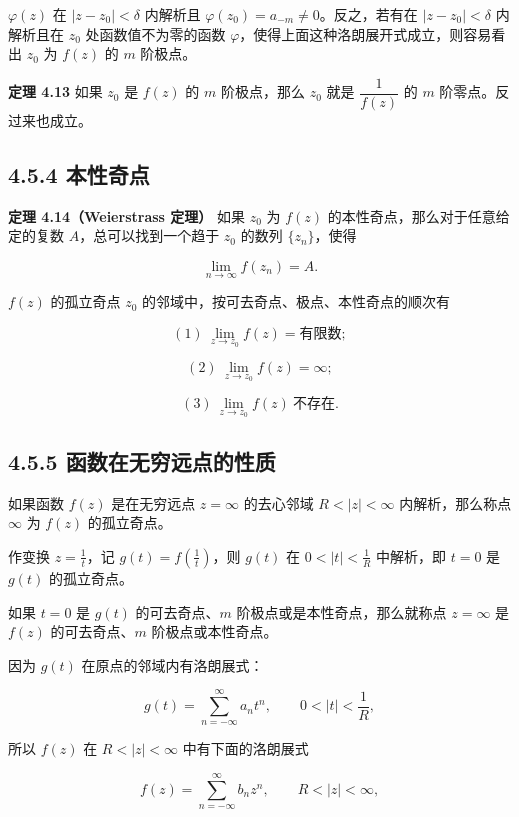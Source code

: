 \(\varphi(z)\) 在 \(|z-z_0|<\delta\) 内解析且
\(\varphi(z_0)=a_{-m}\neq 0\)。反之，若有在 \(|z-z_0|<\delta\)
内解析且在 \(z_0\) 处函数值不为零的函数
\(\varphi\)，使得上面这种洛朗展开式成立，则容易看出 \(z_0\) 为 \(f(z)\)
的 \(m\) 阶极点。

\textbf{定理 4.13} 如果 \(z_0\) 是 \(f(z)\) 的 \(m\) 阶极点，那么
\(z_0\) 就是 \(\dfrac{1}{f(z)}\) 的 \(m\) 阶零点。反过来也成立。

\subsection{4.5.4 本性奇点}\label{ux672cux6027ux5947ux70b9}

\textbf{定理 4.14（Weierstrass 定理）} 如果 \(z_0\) 为 \(f(z)\)
的本性奇点，那么对于任意给定的复数 \(A\)，总可以找到一个趋于 \(z_0\)
的数列 \(\{z_n\}\)，使得

\[
\lim_{n\to\infty}f(z_n)=A .
\]

\(f(z)\) 的孤立奇点 \(z_0\) 的邻域中，按可去奇点、极点、本性奇点的顺次有

\[
(1)\ \lim_{z\to z_0}f(z)=\text{有限数};
\]

\[
(2)\ \lim_{z\to z_0}f(z)=\infty;
\]

\[
(3)\ \lim_{z\to z_0}f(z)\ \text{不存在}.
\]

\subsection{4.5.5
函数在无穷远点的性质}\label{ux51fdux6570ux5728ux65e0ux7a77ux8fdcux70b9ux7684ux6027ux8d28}

如果函数 \(f(z)\) 是在无穷远点 \(z=\infty\) 的去心邻域 \(R<|z|<\infty\)
内解析，那么称点 \(\infty\) 为 \(f(z)\) 的孤立奇点。

作变换 \(\displaystyle z=\frac{1}{t}\)，记
\(\displaystyle g(t)=f\left(\frac{1}{t}\right)\)，则 \(g(t)\) 在
\(0<|t|<\frac{1}{R}\) 中解析，即 \(t=0\) 是 \(g(t)\) 的孤立奇点。

如果 \(t=0\) 是 \(g(t)\) 的可去奇点、\(m\)
阶极点或是本性奇点，那么就称点 \(z=\infty\) 是 \(f(z)\)
的可去奇点、\(m\) 阶极点或本性奇点。

因为 \(g(t)\) 在原点的邻域内有洛朗展式：

\[
g(t)=\sum_{n=-\infty}^{\infty}a_n t^n,\qquad 0<|t|<\frac{1}{R},
\]

所以 \(f(z)\) 在 \(R<|z|<\infty\) 中有下面的洛朗展式

\[
f(z)=\sum_{n=-\infty}^{\infty}b_n z^n,\qquad R<|z|<\infty,
\]

